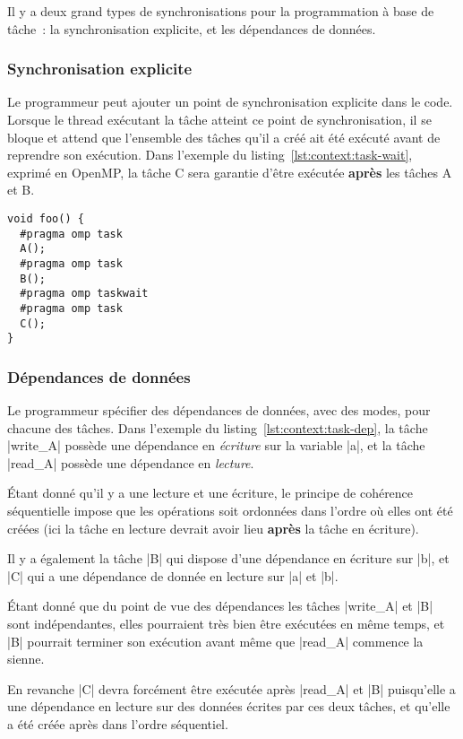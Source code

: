 Il y a deux grand types de synchronisations pour la programmation à base de tâche~: la synchronisation explicite, et les dépendances de données.

\subsubsection{Synchronisation explicite}

Le programmeur peut ajouter un point de synchronisation explicite dans le code.
Lorsque le thread exécutant la tâche atteint ce point de synchronisation, il se bloque et attend que l'ensemble des tâches qu'il a créé ait été exécuté avant de reprendre son exécution. Dans l'exemple du listing~\ref{lst:context:task-wait}, exprimé en OpenMP, la tâche C sera garantie d'être exécutée \textbf{après} les tâches A et B.

\begin{lstlisting}[caption=Synchronisation dans le thread courant (OpenMP),label=lst:context:task-wait]
void foo() {
  #pragma omp task
  A();
  #pragma omp task
  B();
  #pragma omp taskwait
  #pragma omp task
  C();
}
\end{lstlisting}


\subsubsection{Dépendances de données}

Le programmeur spécifier des dépendances de données, avec des modes, pour chacune des tâches.
Dans l'exemple du listing~\ref{lst:context:task-dep}, la tâche |write_A| possède une dépendance en \emph{écriture} sur la variable |a|, et la tâche |read_A| possède une dépendance en \emph{lecture}.

Étant donné qu'il y a une lecture et une écriture, le principe de cohérence séquentielle impose que les opérations soit ordonnées dans l'ordre où elles ont été créées (ici la tâche en lecture devrait avoir lieu \textbf{après} la tâche en écriture).

Il y a également la tâche |B| qui dispose d'une dépendance en écriture sur |b|, et |C| qui a une dépendance de donnée en lecture sur |a| et |b|.

Étant donné que du point de vue des dépendances les tâches |write_A| et |B| sont indépendantes, elles pourraient très bien être exécutées en même temps, et |B| pourrait terminer son exécution avant même que |read_A| commence la sienne.

En revanche |C| devra forcément être exécutée après |read_A| et |B| puisqu'elle a une dépendance en lecture sur des données écrites par ces deux tâches, et qu'elle a été créée après dans l'ordre séquentiel.


